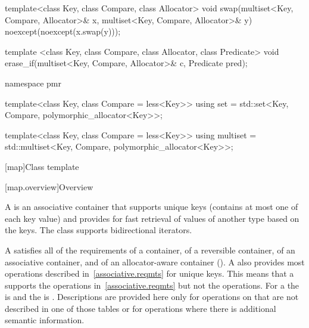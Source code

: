 \begin{codeblock}
{  template<class Key, class Compare, class Allocator>
    void swap(multiset<Key, Compare, Allocator>& x,
              multiset<Key, Compare, Allocator>& y)
      noexcept(noexcept(x.swap(y)));

  template <class Key, class Compare, class Allocator, class Predicate>
    void erase_if(multiset<Key, Compare, Allocator>& c, Predicate pred);

  namespace pmr {
    template<class Key, class Compare = less<Key>>
      using set = std::set<Key, Compare, polymorphic_allocator<Key>>;

    template<class Key, class Compare = less<Key>>
      using multiset = std::multiset<Key, Compare, polymorphic_allocator<Key>>;
  }
}
\end{codeblock}

[map]{Class template }

[map.overview]{Overview}

%
\pnum
A  is an associative container that
supports unique keys (contains at most one of each key value) and
provides for fast retrieval of values of another type  based
on the keys. The  class supports bidirectional iterators.

\pnum
A
satisfies all of the requirements of a container, of a reversible container, of
an associative container, and of an allocator-aware container ().
A
also provides most operations described in~\ref{associative.reqmts}
for unique keys.
This means that a
supports the
operations in~\ref{associative.reqmts}
but not the
operations.
For a
the
is
and the
is
.
Descriptions are provided here only for operations on
that are not described in one of those tables
or for operations where there is additional semantic information.

